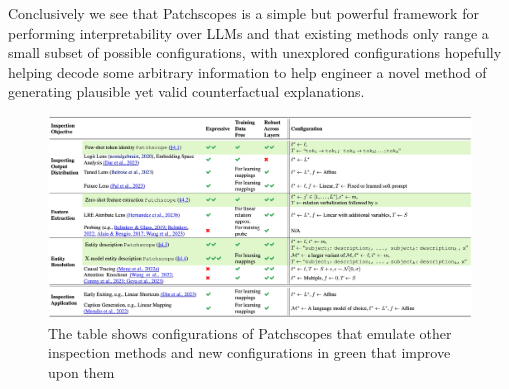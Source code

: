 Conclusively we see that Patchscopes is a simple but powerful framework for performing interpretability over LLMs and that existing methods only range a small subset of possible configurations, with unexplored configurations hopefully helping decode some arbitrary information to help engineer a novel method of generating plausible yet valid counterfactual explanations.

\begin{figure}[ht]

    \includegraphics[width=1\linewidth]{patchscopes_configs.png}
    \caption{The table shows configurations of Patchscopes that emulate other inspection methods and new configurations in green that improve upon them \cite{ghandeharioun_patchscopes_2024}}
    \label{fig:patchscopes_configs}
\end{figure}
